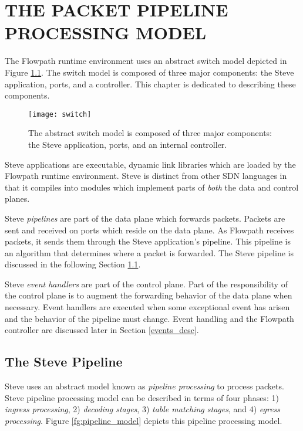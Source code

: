 \chapter{THE PACKET PIPELINE PROCESSING MODEL} \label{ch:pipeline_model}

The Flowpath runtime environment uses an abstract switch model depicted in Figure \ref{fg:abstract_switch}. The switch model is composed of three major components: the Steve application, ports, and a controller. This chapter is dedicated to describing these components.

\begin{figure}[ht]
\texttt{[image: switch]}
\caption{The abstract switch model is composed of three major components: the Steve application, ports, and an internal controller.}
\label{fg:abstract_switch} 
\end{figure}

Steve applications are executable, dynamic link libraries which are loaded by the Flowpath runtime environment. Steve is distinct from other SDN languages in that it compiles into modules which implement parts of \textit{both} the data and control planes. 

Steve \textit{pipelines} are part of the data plane which forwards packets. Packets are sent and received on ports which reside on the data plane. As Flowpath receives packets, it sends them through the Steve application's pipeline. This pipeline is an algorithm that determines where a packet is forwarded. The Steve pipeline is discussed in the following Section \ref{pipeline_desc}.

Steve \textit{event handlers} are part of the control plane. Part of the responsibility of the control plane is to augment the forwarding behavior of the data plane when necessary. Event handlers are executed when some exceptional event has arisen and the behavior of the pipeline must change. Event handling and the Flowpath controller are discussed later in Section \ref{events_desc}.

\section{The Steve Pipeline} \label{pipeline_desc}

Steve uses an abstract model known as \textit{pipeline processing} to process packets. Steve pipeline processing model can be described in terms of four phases: 1)
\textit{ingress processing}, 2) \textit{decoding stages}, 3) \textit{table
matching stages}, and 4) \textit{egress processing}. Figure
\ref{fg:pipeline_model} depicts this pipeline processing model.

